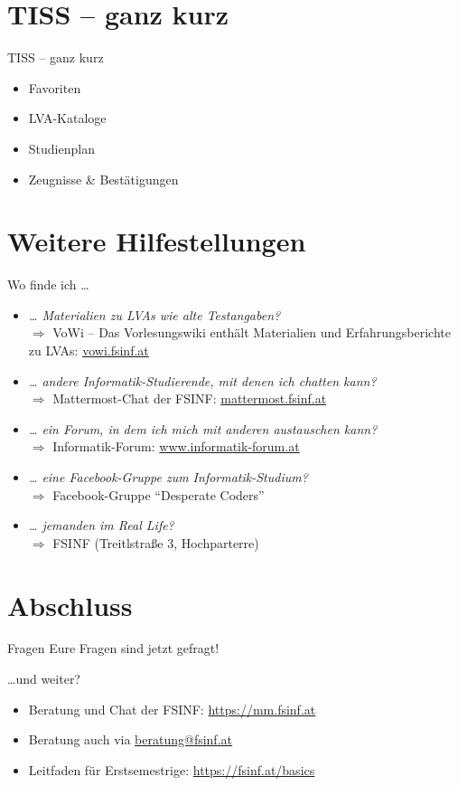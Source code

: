 \documentclass{beamer}
\begin{document}
\section{TISS -- ganz kurz}
\begin{frame}{TISS -- ganz kurz}
    \begin{itemize}
        \item Favoriten
        \item LVA-Kataloge
        \item Studienplan
        \item Zeugnisse \& Bestätigungen
    \end{itemize}
\end{frame}

\section{Weitere Hilfestellungen}
\begin{frame}{Wo finde ich \ldots}
    \begin{itemize}
        \item \textit{\ldots{} Materialien zu LVAs wie alte Testangaben?} \\
              $\Rightarrow$ VoWi -- Das Vorlesungswiki enthält Materialien und
              Erfahrungsberichte zu LVAs: \url{vowi.fsinf.at}
        \item \textit{\ldots{} andere Informatik-Studierende, mit denen ich
              chatten kann?} \\
              $\Rightarrow$ Mattermost-Chat der FSINF: \url{mattermost.fsinf.at}
        \item \textit{\ldots{} ein Forum, in dem ich mich mit anderen
            austauschen kann?} \\
              $\Rightarrow$ Informatik-Forum: \url{www.informatik-forum.at}
        \item \textit{\ldots{} eine Facebook-Gruppe zum Informatik-Studium?} \\
              $\Rightarrow$ Facebook-Gruppe "`Desperate Coders"'
        \item \textit{\ldots{} jemanden im Real Life?} \\
              $\Rightarrow$ FSINF (Treitlstraße 3, Hochparterre)
    \end{itemize}
\end{frame}

\section*{Abschluss}
\begin{frame}{Fragen}
    Eure Fragen sind jetzt gefragt!
\end{frame}

\begin{frame}{\ldots und weiter?}
    \begin{itemize}
        \item Beratung und Chat der FSINF: \url{https://mm.fsinf.at}
        \item Beratung auch via \url{beratung@fsinf.at}
        \item Leitfaden für Erstsemestrige: \url{https://fsinf.at/basics}
    \end{itemize}
\end{frame}
\end{document}
